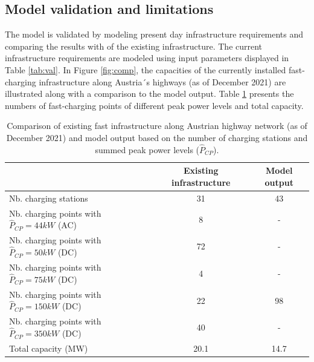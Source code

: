 \documentclass[journal,article,submit,pdftex,moreauthors]{Definitions/mdpi}
\begin{document}
\begin{table}[H]
    \end{table}
    

    \subsection{Model validation and limitations \label{sec:val}}
    The model is validated by modeling present day infrastructure requirements and comparing the results with  of the existing infrastructure. The current infrastructure requirements are modeled using input parameters displayed in Table \ref{tab:val}. In Figure \ref{fig:comp}, the capacities of the currently installed fast-charging infrastructure along Austria´s highways (as of December 2021) are illustrated along with a comparison to the model output. Table \ref{tab:validation} presents the numbers of fast-charging points of different peak power levels and total capacity. 


    
    
    \begin{table}[h]
    \centering
    \caption{Comparison of existing fast infrastructure along Austrian highway network (as of December 2021) and model output based on the number of charging stations and summed peak power levels ($\hat{P}_{CP}$).\label{tab:validation}}
    
    \begin{tabularx}{\textwidth}{@{}lcc@{}}
    \toprule
                                                  & Existing infrastructure & Model output \\ \midrule
    Nb. charging stations                   & 31                      & 43           \\
    Nb. charging points with $\hat{P}_{CP} = 44 kW$ (AC)& 8 &  - \\
    Nb. charging points with $\hat{P}_{CP} = 50 kW$  (DC)&     72                    & -            \\
    Nb. charging points with $\hat{P}_{CP} = 75 kW$  (DC)&      4                   & -            \\
    Nb. charging points with $\hat{P}_{CP} = 150 kW$ (DC)&        22                 & 98         \\
    Nb. charging points with $\hat{P}_{CP} = 350 kW$ (DC) &         40                & -            \\ \midrule
    Total capacity (MW) & 20.1 & 14.7\\
    \bottomrule
    \end{tabularx}
    
    \end{table}
    
\end{document}
